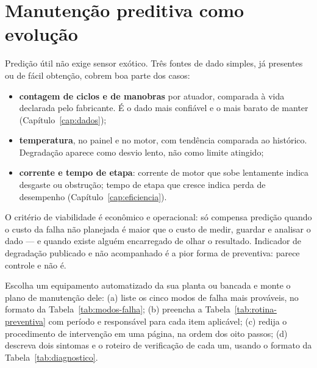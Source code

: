 \section{Manutenção preditiva como evolução}

Predição útil não exige sensor exótico. Três fontes de dado simples, já presentes ou de fácil
obtenção, cobrem boa parte dos casos:

\begin{itemize}
  \item \textbf{contagem de ciclos e de manobras} por atuador, comparada à vida declarada pelo
        fabricante. É o dado mais confiável e o mais barato de manter
        (Capítulo~\ref{cap:dados});
  \item \textbf{temperatura}, no painel e no motor, com tendência comparada ao histórico. Degradação
        aparece como desvio lento, não como limite atingido;
  \item \textbf{corrente e tempo de etapa}: corrente de motor que sobe lentamente indica desgaste ou
        obstrução; tempo de etapa que cresce indica perda de desempenho
        (Capítulo~\ref{cap:eficiencia}).
\end{itemize}

O critério de viabilidade é econômico e operacional: só compensa predição quando o custo da falha
não planejada é maior que o custo de medir, guardar e analisar o dado --- e quando existe alguém
encarregado de olhar o resultado. Indicador de degradação publicado e não acompanhado é a pior forma
de preventiva: parece controle e não é.

\begin{pratica}
Escolha um equipamento automatizado da sua planta ou bancada e monte o plano de manutenção dele:
(a) liste os cinco modos de falha mais prováveis, no formato da Tabela~\ref{tab:modos-falha};
(b) preencha a Tabela~\ref{tab:rotina-preventiva} com período e responsável para cada item aplicável;
(c) redija o procedimento de intervenção em uma página, na ordem dos oito passos;
(d) descreva dois sintomas e o roteiro de verificação de cada um, usando o formato da
Tabela~\ref{tab:diagnostico}.
\end{pratica}

